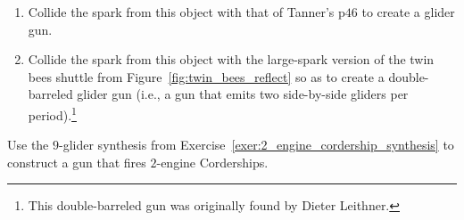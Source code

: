 \begin{multicols}{2}
\begin{problem}
		\begin{enumerate}[label=\bf\color{ocre}(\alph*)]
			\item {} Collide the spark from this object with that of Tanner's p$46$ to create a glider gun.
			
			
			\item {} Collide the spark from this object with the large-spark version of the twin bees shuttle from Figure~\ref{fig:twin_bees_reflect} so as to create a double-barreled glider gun (i.e., a gun that emits two side-by-side gliders per period).\footnote{This double-barreled gun was originally found by Dieter Leithner.}
		\end{enumerate}
	\end{problem}
	
	
	\mfilbreak
	
	
	\begin{problem}\label{exer:2eng_corder_gun} 
		Use the $9$-glider synthesis from Exercise~\ref{exer:2_engine_cordership_synthesis} to construct a gun that fires $2$-engine Corderships.
		
	\end{problem}
	
	
	\mfilbreak
	

\end{multicols}
